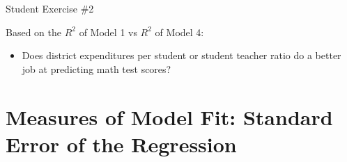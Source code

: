 \documentclass[
  8pt,
  ignorenonframetext,
  dvipsnames]{beamer}
\providecommand{\tightlist}{%
  \setlength{\itemsep}{0pt}\setlength{\parskip}{0pt}}
\let\olditem\item
\renewcommand{\item}{%
  \olditem\vspace{4pt}
}
\begin{document}
\begin{frame}{Student Exercise \#2}
\protect\hypertarget{student-exercise-2-1}{}

Based on the \(R^2\) of Model 1 vs \(R^2\) of Model 4:

\begin{itemize}
\tightlist
\item
  Does district expenditures per student or student teacher ratio do a
  better job at predicting math test scores?
\end{itemize}

\end{frame}

\hypertarget{measures-of-model-fit-standard-error-of-the-regression}{%
\section{Measures of Model Fit: Standard Error of the
Regression}\label{measures-of-model-fit-standard-error-of-the-regression}}
\end{document}
